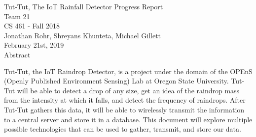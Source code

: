 \documentclass[letterpaper,10pt,draftclsnofoot,onecolumn]{article}
\begin{document}
\begin{titlepage}
\vspace*{\fill}
\begin{center}
{\Large Tut-Tut, The IoT Rainfall Detector Progress Report}
\\[0.3cm]

{\large Team 21}
\\[0.3cm]

{\large CS 461 - Fall 2018}
\\[0.3cm]

{\large Jonathan Rohr,}
{\large Shreyans Khunteta,}
{\large Michael Gillett}
\\[0.3cm]

{\large February 21st, 2019}
\\[1cm]

{\Large Abstract}
\end{center}

Tut-Tut, the IoT Raindrop Detector, is a project under the domain of the OPEnS (Openly Published Environment Sensing) Lab at Oregon State University. Tut-Tut will be able to detect a drop of any size, get an idea of the raindrop mass from the intensity at which it falls, and detect the frequency of raindrops. After Tut-Tut gathers this data, it will be able to wirelessly transmit the information to a central server and store it in a database. This document will explore multiple possible technologies that can be used to gather, transmit, and store our data.
\vspace*{\fill}
\end{titlepage}
\end{document}
